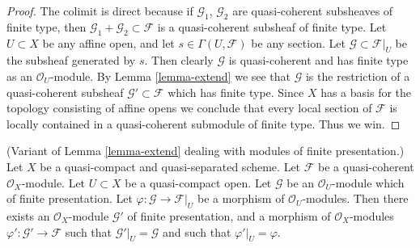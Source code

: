 \begin{proof}
The colimit is direct because if $\mathcal{G}_1$, $\mathcal{G}_2$
are quasi-coherent subsheaves of finite type, then
$\mathcal{G}_1 + \mathcal{G}_2 \subset \mathcal{F}$ is
a quasi-coherent subsheaf of finite type.
Let $U \subset X$ be any affine open, and let
$s \in \Gamma(U, \mathcal{F})$ be any section.
Let $\mathcal{G} \subset \mathcal{F}|_U$ be the
subsheaf generated by $s$. Then clearly $\mathcal{G}$
is quasi-coherent and has finite type as an $\mathcal{O}_U$-module.
By Lemma \ref{lemma-extend} we see that $\mathcal{G}$ is the restriction
of a quasi-coherent subsheaf $\mathcal{G}' \subset \mathcal{F}$
which has finite type. Since $X$ has a basis for the topology consisting
of affine opens we conclude that every local section of
$\mathcal{F}$ is locally contained in a quasi-coherent submodule
of finite type. Thus we win.
\end{proof}

\begin{lemma}
\label{lemma-extend-finite-presentation}
(Variant of Lemma \ref{lemma-extend} dealing with modules of
finite presentation.)
Let $X$ be a quasi-compact and quasi-separated scheme.
Let $\mathcal{F}$ be a quasi-coherent $\mathcal{O}_X$-module.
Let $U \subset X$ be a quasi-compact open.
Let $\mathcal{G}$ be an $\mathcal{O}_U$-module which of finite presentation.
Let $\varphi : \mathcal{G} \to \mathcal{F}|_U$ be a morphism of
$\mathcal{O}_U$-modules.
Then there exists an $\mathcal{O}_X$-module
$\mathcal{G}'$ of finite presentation, and a morphism
of $\mathcal{O}_X$-modules $\varphi' : \mathcal{G}' \to \mathcal{F}$
such that $\mathcal{G}'|_U = \mathcal{G}$ and such that
$\varphi'|_U = \varphi$.
\end{lemma}

